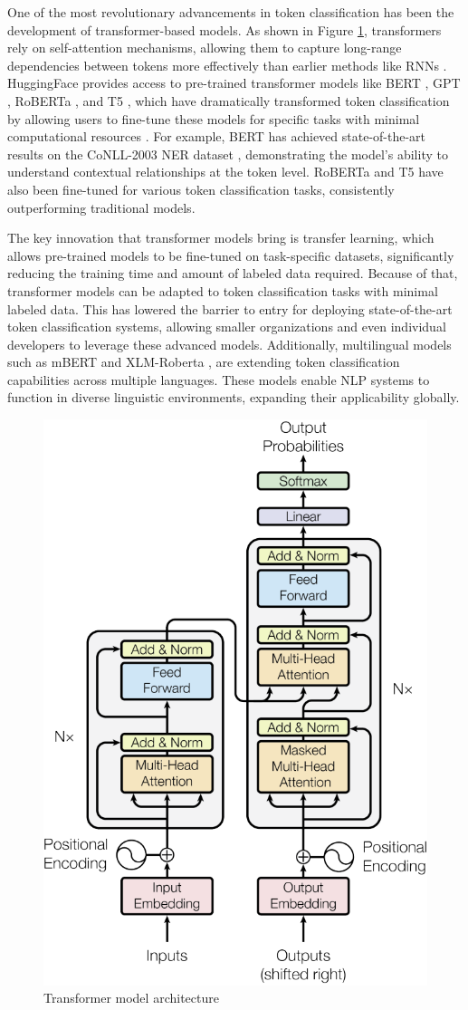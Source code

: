 \documentclass{Configuration_Files/PoliMi3i_thesis}
\begin{document}
One of the most revolutionary advancements in token classification has been the development of transformer-based models. As shown in Figure \ref{transformers_self_attention}, transformers rely on self-attention mechanisms, allowing them to capture long-range dependencies between tokens more effectively than earlier methods like RNNs \cite{vaswani2017attention}. HuggingFace provides access to pre-trained transformer models like BERT \cite{devlin-etal-2019-bert}, GPT \cite{yenduri2024gpt}, RoBERTa \cite{Liu2019RoBERTaAR}, and T5 \cite{ni2022sentence}, which have dramatically transformed token classification by allowing users to fine-tune these models for specific tasks with minimal computational resources \cite{wolf2020transformers}. For example, BERT has achieved state-of-the-art results on the CoNLL-2003 NER dataset \cite{sang2003introduction}, demonstrating the model's ability to understand contextual relationships at the token level. RoBERTa and T5 have also been fine-tuned for various token classification tasks, consistently outperforming traditional models.

The key innovation that transformer models bring is transfer learning, which allows pre-trained models to be fine-tuned on task-specific datasets, significantly reducing the training time and amount of labeled data required. Because of that, transformer models can be adapted to token classification tasks with minimal labeled data. This has lowered the barrier to entry for deploying state-of-the-art token classification systems, allowing smaller organizations and even individual developers to leverage these advanced models. 
Additionally, multilingual models such as mBERT \cite{pires2019multilingual} and XLM-Roberta \cite{conneau2019unsupervised}, are extending token classification capabilities across multiple languages. These models enable NLP systems to function in diverse linguistic environments, expanding their applicability globally.

\begin{figure}[h!] 
\centering 
\includegraphics[width=0.48\linewidth, height=0.48\textheight]{Images/transformers_model.png} 
\caption{Transformer model architecture \cite{vaswani2017attention}} 
\label{transformers_self_attention} 
\end{figure} 
\FloatBarrier
\end{document}
